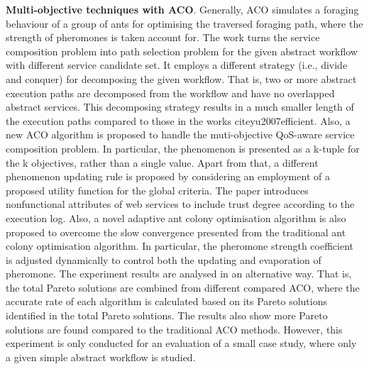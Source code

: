 \textbf{Multi-objective techniques with ACO}. Generally, ACO simulates a foraging behaviour of a group of ants for optimising the traversed foraging path, where the strength of pheromones is taken account for. The work \cite{zhang2010qos} turns the service composition problem into path selection problem for the given abstract workflow with different service candidate set.  It employs a different strategy (i.e., divide and conquer) for decomposing the given workflow. That is,  two or more abstract execution paths are decomposed from the workflow and have no overlapped abstract services. This decomposing strategy results in a much smaller length of the execution paths compared to those in the works cite{yu2007efficient}.  Also, a new ACO algorithm is proposed to handle the muti-objective QoS-aware service composition problem. In particular,  the phenomenon is presented as a k-tuple for the k objectives, rather than a single value. Apart from that, a different phenomenon updating rule is proposed by considering an employment of a proposed utility function for the global criteria. The paper \cite{wang2014novel} introduces nonfunctional attributes of web services to include trust degree according to the execution log.  Also, a novel adaptive ant colony optimisation algorithm is also proposed to overcome the slow convergence presented from the traditional ant colony optimisation algorithm. In particular, the pheromone strength coefficient is adjusted dynamically to control both the updating and evaporation of pheromone. The experiment results are analysed in an alternative way. That is,  the total Pareto solutions are combined from different compared ACO, where the accurate rate of each algorithm is calculated based on its Pareto solutions identified in the total Pareto solutions. The results also show more Pareto solutions are found compared to the traditional ACO methods. However,  this experiment is only conducted for an evaluation of a small case study, where only a  given simple abstract workflow is studied.











